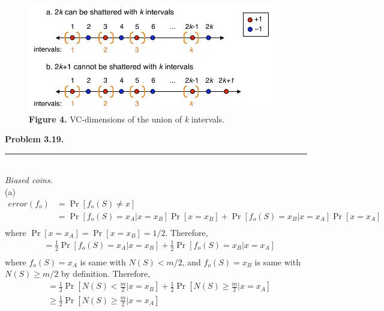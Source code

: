\documentclass[letterpaper,11pt,notitlepage]{article}
\begin{document}
\begin{figure}[ht!]
	\centering
	\includegraphics[width=11cm]{Figure3_13}
	\captionsetup{width=.8\textwidth}
	\caption{\textbf{Figure 4.} VC-dimensions of the union of \textit{k} intervals.} 
\end{figure}

\hspace*{-1cm}\textbf{Problem 3.19.}  \rule{10.5cm}{0.4pt}\\
\noindent\textit{Biased coins.}\\

\noindent (a)
\begin{align*} 
error(f_o) &= \Pr [f_o(S) \neq x]\\
&= \Pr[f_o(S)=x_A|x=x_B]\Pr[x=x_B]+\Pr[f_o(S)=x_B|x=x_A]\Pr[x=x_A]\\ 
\end{align*}
where $\Pr[x=x_A]=\Pr[x=x_B]=1/2$. Therefore,\\
\begin{align*} 
&= \frac{1}{2}\Pr[f_o(S)=x_A|x=x_B]+\frac{1}{2}\Pr[f_o(S)=x_B|x=x_A]\\ 
\end{align*}
where $f_o(S)=x_A$ is same with $N(S)<m/2$, and $f_o(S)=x_B$ is same with $N(S)\ge m/2$ by definition. Therefore,\\
\begin{align*} 
&= \frac{1}{2}\Pr[N(S)<\frac{m}{2}|x=x_B]+\frac{1}{2}\Pr[N(S)\ge\frac{m}{2}|x=x_A]\\
&\ge \frac{1}{2}\Pr[N(S)\ge\frac{m}{2}|x=x_A]\\ 
\end{align*}
\end{document}
